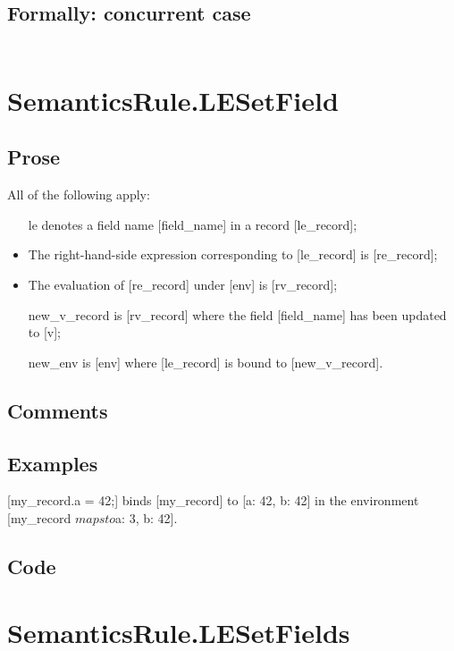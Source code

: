 \documentclass{book}
\begin{document}
  \subsection{Formally: concurrent case}
  \begin{align}
  \end{align} 

\section{SemanticsRule.LESetField \label{sec:SemanticsRule.LESetField}}

    \subsection{Prose}
    All of the following apply:
    \begin{itemize}
    \item [le] denotes a field name [field\_name] in a record [le\_record];
    \item The right-hand-side expression corresponding to [le\_record] is
      [re\_record];
    \item The evaluation of [re\_record] under [env] is [rv\_record];
    \item [new\_v\_record] is [rv\_record] where the field [field\_name] has been
      updated to [v];
    \item [new\_env] is [env] where [le\_record] is bound to
      [new\_v\_record].
    \end{itemize}

    \subsection{Comments}

    \subsection{Examples}
    [my\_record.a = 42;] binds [my\_record] to [{a: 42, b: 42}] in the environment [my\_record $mapsto${a: 3, b: 42}].

  \subsection{Code}

\section{SemanticsRule.LESetFields \label{sec:SemanticsRule.LESetFields}}
\end{document}
